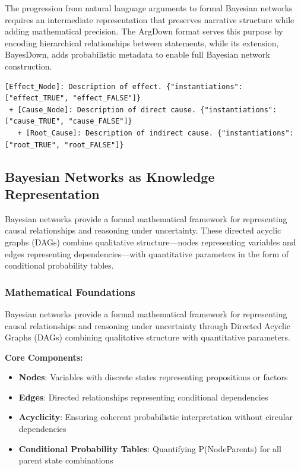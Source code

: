 \documentclass[
  11pt,
  letterpaper,
]{book}
\providecommand{\tightlist}{%
  \setlength{\itemsep}{0pt}\setlength{\parskip}{0pt}}
\begin{document}
The progression from natural language arguments to formal Bayesian
networks requires an intermediate representation that preserves
narrative structure while adding mathematical precision. The ArgDown
format serves this purpose by encoding hierarchical relationships
between statements, while its extension, BayesDown, adds probabilistic
metadata to enable full Bayesian network construction.

\begin{verbatim}
[Effect_Node]: Description of effect. {"instantiations": ["effect_TRUE", "effect_FALSE"]}
 + [Cause_Node]: Description of direct cause. {"instantiations": ["cause_TRUE", "cause_FALSE"]}
   + [Root_Cause]: Description of indirect cause. {"instantiations": ["root_TRUE", "root_FALSE"]}
\end{verbatim}

\subsection{Bayesian Networks as Knowledge
Representation}\label{sec-bayesian-networks}

Bayesian networks provide a formal mathematical framework for
representing causal relationships and reasoning under uncertainty. These
directed acyclic graphs (DAGs) combine qualitative structure---nodes
representing variables and edges representing dependencies---with
quantitative parameters in the form of conditional probability tables.

\subsubsection{Mathematical
Foundations}\label{sec-mathematical-foundations}

Bayesian networks provide a formal mathematical framework for
representing causal relationships and reasoning under uncertainty
through Directed Acyclic Graphs (DAGs) combining qualitative structure
with quantitative parameters.

\textbf{Core Components:}

\begin{itemize}
\tightlist
\item
  \textbf{Nodes}: Variables with discrete states representing
  propositions or factors
\item
  \textbf{Edges}: Directed relationships representing conditional
  dependencies
\item
  \textbf{Acyclicity}: Ensuring coherent probabilistic interpretation
  without circular dependencies
\item
  \textbf{Conditional Probability Tables}: Quantifying
  P(Node\textbar Parents) for all parent state combinations
\end{itemize}
\end{document}
